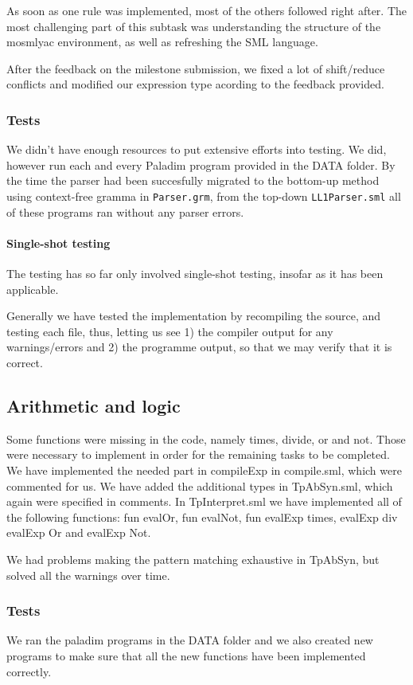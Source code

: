 \documentclass[11pt]{article}
\begin{document}
As soon as one rule was implemented, most of the others followed right after.
The most challenging part of this subtask was understanding the structure of
the mosmlyac environment, as well as refreshing the SML language.

After the feedback on the milestone submission, we fixed a lot of shift/reduce conflicts and modified our expression type acording to the feedback provided.

\subsubsection{Tests}
We didn't have enough resources to put extensive efforts into testing. We did,
however run each and every Paladim program provided in the DATA folder. By the
time the parser had been succesfully migrated to the bottom-up method using
context-free gramma in {\tt Parser.grm}, from the top-down {\tt LL1Parser.sml}
all of these programs ran without any parser errors.

\paragraph{Single-shot testing}
The testing has so far only involved single-shot testing, insofar as it has
been applicable.

Generally we have tested the implementation by recompiling the source, and
testing each file, thus, letting us see 1) the compiler output for any
warnings/errors and 2) the programme output, so that we may verify that it
is correct.

\subsection{Arithmetic and logic}
Some functions were missing in the code, namely times, divide, or and not. Those were necessary to implement in order for the remaining tasks to be completed.
We have implemented the needed part in compileExp in compile.sml, which were commented for us. We have added the additional types in TpAbSyn.sml, which again were specified in comments. In TpInterpret.sml we have implemented all of the following functions: fun evalOr, fun evalNot, fun evalExp times, evalExp div evalExp Or and evalExp Not.

We had problems making the pattern matching exhaustive in TpAbSyn, but solved all the warnings over time.

\subsubsection{Tests}
We ran the paladim programs in the DATA folder and we also created new programs to make sure that all the new functions have been implemented correctly.
 
\end{document}
